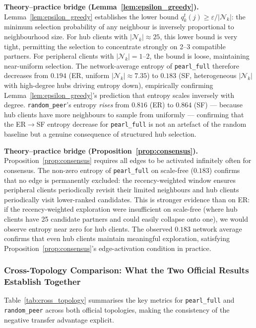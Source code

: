 \documentclass[conference]{IEEEtran}
\begin{document}
\textbf{Theory--practice bridge (Lemma~\ref{lem:epsilon_greedy}).}
Lemma~\ref{lem:epsilon_greedy} establishes the lower bound $q_k^t(j) \geq \varepsilon/|\mathcal{N}_k|$: the minimum selection probability of any neighbour is inversely proportional to neighbourhood size. For hub clients with $|\mathcal{N}_k|\approx25$, this lower bound is very tight, permitting the selection to concentrate strongly on 2--3 compatible partners. For peripheral clients with $|\mathcal{N}_k|=1$--$2$, the bound is loose, maintaining near-uniform selection. The network-average entropy of \texttt{pearl\_full} therefore decreases from $0.194$ (ER, uniform $|\mathcal{N}_k|\approx7.35$) to $0.183$ (SF, heterogeneous $|\mathcal{N}_k|$ with high-degree hubs driving entropy down), empirically confirming Lemma~\ref{lem:epsilon_greedy}'s prediction that entropy scales inversely with degree. \texttt{random\_peer}'s entropy \emph{rises} from $0.816$ (ER) to $0.864$ (SF) --- because hub clients have more neighbours to sample from uniformly --- confirming that the ER$\to$SF entropy decrease for \texttt{pearl\_full} is not an artefact of the random baseline but a genuine consequence of structured hub selection.

\textbf{Theory--practice bridge (Proposition~\ref{prop:consensus}).}
Proposition~\ref{prop:consensus} requires all edges to be activated infinitely often for consensus. The non-zero entropy of \texttt{pearl\_full} on scale-free ($0.183$) confirms that no edge is permanently excluded: the recency-weighted window ensures peripheral clients periodically revisit their limited neighbours and hub clients periodically visit lower-ranked candidates. This is stronger evidence than on ER: if the recency-weighted exploration were insufficient on scale-free (where hub clients have 25 candidate partners and could easily collapse onto one), we would observe entropy near zero for hub clients. The observed $0.183$ network average confirms that even hub clients maintain meaningful exploration, satisfying Proposition~\ref{prop:consensus}'s edge-activation condition in practice.

\subsubsection{Cross-Topology Comparison: What the Two Official Results Establish Together}
\label{subsubsec:cross-topology}

Table~\ref{tab:cross_topology} summarises the key metrics for \texttt{pearl\_full} and \texttt{random\_peer} across both official topologies, making the consistency of the negative transfer advantage explicit.
\end{document}

